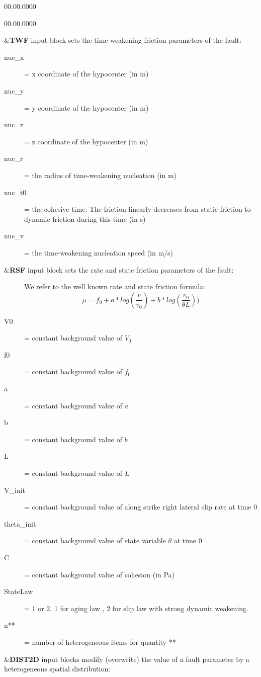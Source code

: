 \begin{lyxlist}{00.00.0000}
\begin{lyxlist}{00.00.0000}
\item [{\&\textbf{TWF}}] input block sets the time-weakening friction parameters
of the fault:
\begin{description}
\item [{nuc\_x}]  = x coordinate of the hypocenter (in m)
\item [{nuc\_y}]  = y coordinate of the hypocenter (in m)
\item [{nuc\_z}]  = z coordinate of the hypocenter (in m)
\item [{nuc\_r}]  = the radius of time-weakening nucleation (in m)
\item [{nuc\_t0}] = the cohesive time. The friction linearly decreases from static friction to dynamic friction during this time (in s)
\item [{nuc\_v}]  = the time-weakening nucleation speed (in m/s)
\end{description}

\item [{\&\textbf{RSF}}] input block sets the rate and state friction parameters
of the fault:
\begin{description}
  \item []
    We refer to the well known rate and state friction formula:
    $$\mu = f_0 + a* log(\frac{v}{v_0}) + b* log(\frac{v_0}{\theta L}))  $$
\item [{V0}] = constant background value of $V_0$
\item [{f0}] = constant background value of $f_0$
\item [{a}] = constant background value of $a$
\item [{b}] = constant background value of $b$
\item [{L}] = constant background value of $L$
\item [{V\_init}] = constant background value of along strike right lateral slip rate at time 0
\item [{theta\_init}] = constant background value of state variable $\theta$ at time 0
\item [{C}] = constant background value of cohesion (in Pa)
\item [{StateLaw}] = 1 or 2. 1 for aging law , 2 for slip law with strong dynamic weakening.
\item [{n**}] = number of heterogeneous items for quantity **
\end{description}

\item [{\&\textbf{DIST2D}}] input blocks modify (overwrite) the value of
a fault parameter by a heterogeneous spatial distribution:


\end{lyxlist}
\end{lyxlist}
